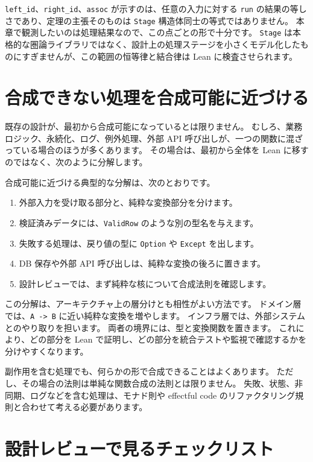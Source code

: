 \texttt{left\_id}、\texttt{right\_id}、\texttt{assoc} が示すのは、任意の入力に対する \texttt{run} の結果の等しさであり、定理の主張そのものは \texttt{Stage} 構造体同士の等式ではありません。
本章で観測したいのは処理結果なので、この点ごとの形で十分です。
\texttt{Stage} は本格的な圏論ライブラリではなく、設計上の処理ステージを小さくモデル化したものにすぎませんが、この範囲の恒等律と結合律は Lean に検査させられます。

\section{合成できない処理を合成可能に近づける}

既存の設計が、最初から合成可能になっているとは限りません。
むしろ、業務ロジック、永続化、ログ、例外処理、外部 API 呼び出しが、一つの関数に混ざっている場合のほうが多くあります。
その場合は、最初から全体を Lean に移すのではなく、次のように分解します。

合成可能に近づける典型的な分解は、次のとおりです。
\begin{enumerate}
\item 外部入力を受け取る部分と、純粋な変換部分を分けます。
\item 検証済みデータには、\texttt{ValidRow} のような別の型名を与えます。
\item 失敗する処理は、戻り値の型に \texttt{Option} や \texttt{Except} を出します。
\item DB 保存や外部 API 呼び出しは、純粋な変換の後ろに置きます。
\item 設計レビューでは、まず純粋な核について合成法則を確認します。
\end{enumerate}

この分解は、アーキテクチャ上の層分けとも相性がよい方法です。
ドメイン層では、\texttt{A -> B} に近い純粋な変換を増やします。
インフラ層では、外部システムとのやり取りを担います。
両者の境界には、型と変換関数を置きます。
これにより、どの部分を Lean で証明し、どの部分を統合テストや監視で確認するかを分けやすくなります。

副作用を含む処理でも、何らかの形で合成できることはよくあります。
ただし、その場合の法則は単純な関数合成の法則とは限りません。
失敗、状態、非同期、ログなどを含む処理は、モナド則や effectful code のリファクタリング規則と合わせて考える必要があります。

\section{設計レビューで見るチェックリスト}

